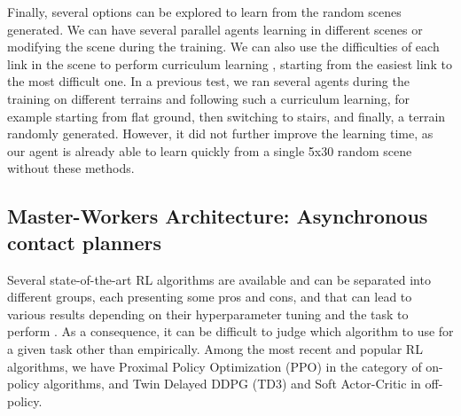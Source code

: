  Finally, several options can be explored to learn from the random scenes generated.
 We can have several parallel agents learning in different scenes or modifying the scene during the training.
 We can also use the difficulties of each link in the scene to perform curriculum learning \cite{curriculum_learning_survey}, starting from the easiest link to the most difficult one.
 In a previous test, we ran several agents during the training on different terrains and following such a curriculum learning, for example starting from flat ground, then switching to stairs, and finally, a terrain randomly generated. However, it did not further improve the learning time, as our agent is already able to learn quickly from a single 5x30 random scene without these methods.
 
 
\subsection{Master-Workers Architecture: Asynchronous contact planners\label{subsub:leas:master_worker}}

Several state-of-the-art RL algorithms are available and can be separated into different groups, each presenting some pros and cons, and that can lead to various results depending on their hyperparameter tuning and the task to perform \cite{RL_that_matters, RL_that_matters_OnPolicy}. As a consequence, it can be difficult to judge which algorithm to use for a given task other than empirically. 
Among the most recent and popular RL algorithms, we have Proximal Policy Optimization (PPO) \cite{PPO_2017} in the category of on-policy algorithms, and Twin Delayed DDPG (TD3) \cite{TD3_2018} and Soft Actor-Critic \cite{SAC_2018} in off-policy.

